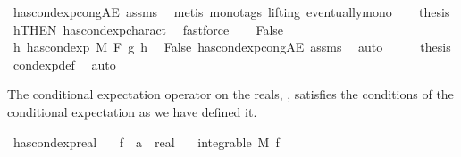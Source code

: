 \begin{isabellebody}
\ has{\isacharunderscore}{\kern0pt}cond{\isacharunderscore}{\kern0pt}exp{\isacharunderscore}{\kern0pt}cong{\isacharunderscore}{\kern0pt}AE\ assms\ \isamarkupfalse%
\ {\isacharparenleft}{\kern0pt}metis\ {\isacharparenleft}{\kern0pt}mono{\isacharunderscore}{\kern0pt}tags{\isacharcomma}{\kern0pt}\ lifting{\isacharparenright}{\kern0pt}\ eventually{\isacharunderscore}{\kern0pt}mono{\isacharparenright}{\kern0pt}\isanewline
\ \ \isamarkupfalse%
\ {\isacharquery}{\kern0pt}thesis\ \isamarkupfalse%
\ h{\isacharbrackleft}{\kern0pt}THEN\ has{\isacharunderscore}{\kern0pt}cond{\isacharunderscore}{\kern0pt}exp{\isacharunderscore}{\kern0pt}charact{\isacharparenleft}{\kern0pt}{}{\isacharparenright}{\kern0pt}{\isacharbrackright}{\kern0pt}\ \isamarkupfalse%
\ fastforce\isanewline
{}\isamarkupfalse%
\isanewline
\ \ \isamarkupfalse%
\ False\isanewline
\ \ \isamarkupfalse%
\ \isamarkupfalse%
\ {\isachardoublequoteopen}{\isasymnexists}h{\isachardot}{\kern0pt}\ has{\isacharunderscore}{\kern0pt}cond{\isacharunderscore}{\kern0pt}exp\ M\ F\ g\ h{\isachardoublequoteclose}\ \isamarkupfalse%
\ False\ has{\isacharunderscore}{\kern0pt}cond{\isacharunderscore}{\kern0pt}exp{\isacharunderscore}{\kern0pt}cong{\isacharunderscore}{\kern0pt}AE\ assms\ \isamarkupfalse%
\ auto\isanewline
\ \ \isamarkupfalse%
\ \isamarkupfalse%
\ {\isacharquery}{\kern0pt}thesis\ \isamarkupfalse%
\ cond{\isacharunderscore}{\kern0pt}exp{\isacharunderscore}{\kern0pt}def\ \isamarkupfalse%
\ auto\isanewline
{}\isamarkupfalse%
%
\endisatagproof
{\isafoldproof}%
%
\isadelimproof
%
\endisadelimproof
%
\begin{isamarkuptext}%
The conditional expectation operator on the reals, , satisfies the conditions of the conditional expectation as we have defined it.%
\end{isamarkuptext}\isamarkuptrue%
\isamarkupfalse%
\ has{\isacharunderscore}{\kern0pt}cond{\isacharunderscore}{\kern0pt}exp{\isacharunderscore}{\kern0pt}real{\isacharcolon}{\kern0pt}\isanewline
\ \ \ f\ {\isacharcolon}{\kern0pt}{\isacharcolon}{\kern0pt}\ {\isachardoublequoteopen}{\isacharprime}{\kern0pt}a\ {\isasymRightarrow}\ real{\isachardoublequoteclose}\isanewline
\ \ \ {\isachardoublequoteopen}integrable\ M\ f{\isachardoublequoteclose}\isanewline

\end{isabellebody}
